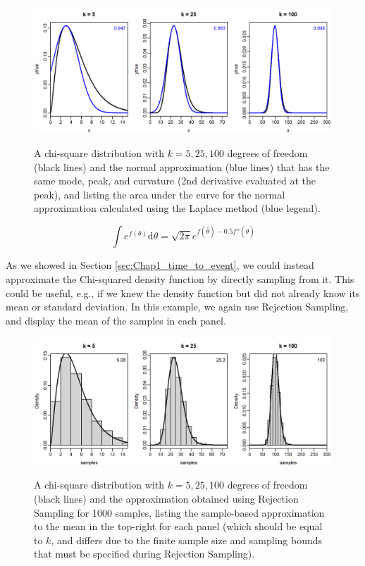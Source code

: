 \begin{figure}[!ht]
    \caption[Laplace example using chi-squared distribution]{A chi-square distribution with \(k={5, 25, 100}\) degrees of freedom (black lines) and the normal approximation (blue lines) that has the same mode, peak, and curvature (2nd derivative evaluated at the peak), and listing the area under the curve for the normal approximation calculated using the Laplace method (blue legend).}
    \centering
    \includegraphics[width=5.5in]{Chap_2/Laplace_demo.png}
    \label{fig:Chap2_laplace}
\end{figure}

\begin{equation}
    \int e^{f(\theta)} \mathrm{d}\theta = \sqrt{2\pi} e^{f(\hat{\theta}) - 0.5 f''(\hat{\theta})}
\end{equation}

As we showed in Section \ref{sec:Chap1_time_to_event}, we could instead approximate the Chi-squared density function by directly sampling from it.  This could be useful, e.g., if we knew the density function but did not already know its mean or standard deviation.  In this example, we again use Rejection Sampling, and display the mean of the samples in each panel.

\begin{figure}[!ht]
    \caption[STAN example using chi-squared distribution]{A chi-square distribution with \(k={5, 25, 100}\) degrees of freedom (black lines) and the approximation obtained using Rejection Sampling for 1000 samples, listing the sample-based approximation to the mean in the top-right for each panel (which should be equal to \(k\), and differs due to the finite sample size and sampling bounds that must be specified during Rejection Sampling).}
    \centering
    \includegraphics[width=5.5in]{Chap_2/Rejection_sampling_demo.png}
    \label{fig:Chap2_rejection}
\end{figure}

